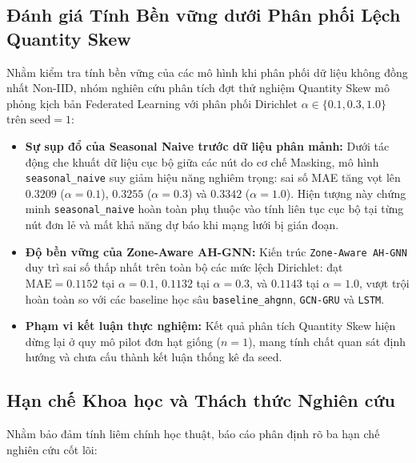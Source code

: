 \subsection{Đánh giá Tính Bền vững dưới Phân phối Lệch Quantity Skew}

Nhằm kiểm tra tính bền vững của các mô hình khi phân phối dữ liệu không đồng nhất Non-IID, nhóm nghiên cứu phân tích đợt thử nghiệm Quantity Skew mô phỏng kịch bản Federated Learning với phân phối Dirichlet $\alpha \in \{0.1, 0.3, 1.0\}$ trên $\text{seed} = 1$:

\begin{itemize}
    \item \textbf{Sự sụp đổ của Seasonal Naive trước dữ liệu phân mảnh:} Dưới tác động che khuất dữ liệu cục bộ giữa các nút do cơ chế Masking, mô hình \texttt{seasonal\_naive} suy giảm hiệu năng nghiêm trọng: sai số MAE tăng vọt lên $0.3209$ ($\alpha=0.1$), $0.3255$ ($\alpha=0.3$) và $0.3342$ ($\alpha=1.0$). Hiện tượng này chứng minh \texttt{seasonal\_naive} hoàn toàn phụ thuộc vào tính liên tục cục bộ tại từng nút đơn lẻ và mất khả năng dự báo khi mạng lưới bị gián đoạn.
    \item \textbf{Độ bền vững của Zone-Aware AH-GNN:} Kiến trúc \texttt{Zone-Aware AH-GNN} duy trì sai số thấp nhất trên toàn bộ các mức lệch Dirichlet: đạt $\text{MAE} = 0.1152$ tại $\alpha=0.1$, $0.1132$ tại $\alpha=0.3$, và $0.1143$ tại $\alpha=1.0$, vượt trội hoàn toàn so với các baseline học sâu \texttt{baseline\_ahgnn}, \texttt{GCN-GRU} và \texttt{LSTM}.
    \item \textbf{Phạm vi kết luận thực nghiệm:} Kết quả phân tích Quantity Skew hiện dừng lại ở quy mô pilot đơn hạt giống ($n=1$), mang tính chất quan sát định hướng và chưa cấu thành kết luận thống kê đa seed.
\end{itemize}

\subsection{Hạn chế Khoa học và Thách thức Nghiên cứu}

Nhằm bảo đảm tính liêm chính học thuật, báo cáo phân định rõ ba hạn chế nghiên cứu cốt lõi:

